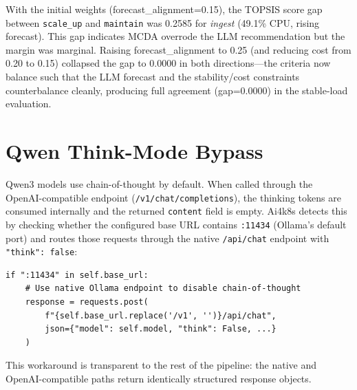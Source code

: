 With the initial weights (forecast\_alignment=0.15), the TOPSIS score gap between
\texttt{scale\_up} and \texttt{maintain} was 0.2585 for \textit{ingest} (49.1\%
CPU, rising forecast). This gap indicates MCDA overrode the LLM recommendation
but the margin was marginal. Raising forecast\_alignment to 0.25 (and reducing
cost from 0.20 to 0.15) collapsed the gap to 0.0000 in both directions—the
criteria now balance such that the LLM forecast and the stability/cost
constraints counterbalance cleanly, producing full agreement (gap=0.0000)
in the stable-load evaluation.

\section{Qwen Think-Mode Bypass}
\label{sec:think-bypass}

Qwen3 models use chain-of-thought by default. When called through the
OpenAI-compatible endpoint (\texttt{/v1/chat/completions}), the thinking tokens
are consumed internally and the returned \texttt{content} field is empty.
Ai4k8s detects this by checking whether the configured base URL contains
\texttt{:11434} (Ollama's default port) and routes those requests through the
native \texttt{/api/chat} endpoint with \texttt{"think": false}:

\begin{verbatim}
if ":11434" in self.base_url:
    # Use native Ollama endpoint to disable chain-of-thought
    response = requests.post(
        f"{self.base_url.replace('/v1', '')}/api/chat",
        json={"model": self.model, "think": False, ...}
    )
\end{verbatim}

This workaround is transparent to the rest of the pipeline: the native and
OpenAI-compatible paths return identically structured response objects.

